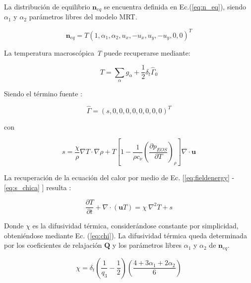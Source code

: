 La distribución de equilibrio $\mathbf{n}_{eq}$ se encuentra definida en Ec.(\ref{eq:n_eq}), siendo $\alpha_{1}$ y $\alpha_{2}$ parámetros libres del modelo MRT.

\begin{equation}
    {\mathbf{n}}_{eq} = T { \left( 1, \alpha_{1}, \alpha_{2}, u_{x}, -u_{x}, u_{y}, -u_{y}, 0, 0 \right) }^{T}
    \label{eq:n_eq}
\end{equation}

La temperatura macroscópica \textit{T} puede recuperarse mediante:

\begin{equation}
T = \sum_{\alpha} g_{\alpha} + \frac{1}{2} \delta_{t} {\hat{\Gamma}}_{0}
\end{equation}



Siendo el término fuente :


\begin{equation}
    \hat{\Gamma} = {( s, 0, 0, 0, 0, 0, 0, 0, 0 )}^{T}
\end{equation}

con 

\begin{equation}
    s = \frac{\chi}{\rho} \nabla T \cdot \nabla \rho + T \left[ 1 - \frac{1}{\rho c_{\nu}} {\left( \frac{\partial p_{EOS}}{\partial T} \right)}_{\rho} \right] \nabla \cdot \mathbf{u}
    \label{eq:s_chica}
\end{equation}

La recuperación de la ecuación del calor por medio de Ec. [\ref{eq:fieldenergy} - \ref{eq:s_chica} ] resulta \cite{markus2011simulation}:

\begin{equation}
    \frac{\partial T}{\partial t} + \nabla \cdot ( \mathbf{u} T ) = \chi \> {\nabla }^{2} T + s
\end{equation}

Donde $\chi$ es la difusividad térmica, considerándose constante por simplicidad, obteniéndose mediante Ec. (\ref{eq:chi}). La difusividad térmica queda determinada por los coeficientes de relajación $\mathbf{Q}$ y los parámetros libres $\alpha_{1}$ y $\alpha_{2}$ de ${\textbf{n}}_{eq}$.

\begin{equation}
    \chi = \delta_{t} \left( \frac{1}{q_{3}} - \frac{1}{2} \right) \left( \frac{ 4 + 3 \alpha_{1} + 2 \alpha_{2}}{6} \right)
    \label{eq:chi}
\end{equation}

